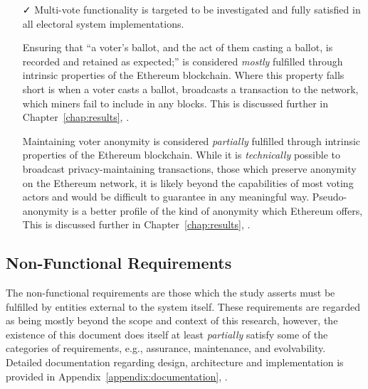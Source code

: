 \begin{itemize}[topsep=0pt]
  \item[\faCheck] Multi-vote functionality is targeted to be investigated and
    fully satisfied in all electoral system implementations.

  \item[\faPlus] Ensuring that ``a voter's ballot, and the act of them casting a
    ballot, is recorded and retained as expected;'' is considered \emph{mostly}
    fulfilled through intrinsic properties of the Ethereum blockchain. Where
    this property falls short is when a voter casts a ballot, broadcasts a
    transaction to the network, which miners fail to include in any blocks. This
    is discussed further in Chapter~\ref{chap:results},
    \emph{}.

  \item[\faMinus] Maintaining voter anonymity is considered \emph{partially}
    fulfilled through intrinsic properties of the Ethereum blockchain. While it
    is \emph{technically} possible to broadcast privacy-maintaining
    transactions, those which preserve anonymity on the Ethereum network, it is
    likely beyond the capabilities of most voting actors and would be difficult
    to guarantee in any meaningful way. Pseudo-anonymity is a better profile of
    the kind of anonymity which Ethereum offers, This is discussed further in
    Chapter~\ref{chap:results}, \emph{}.
\end{itemize}

\subsection{Non-Functional Requirements}
The non-functional requirements are those which the study asserts must be
fulfilled by entities external to the system itself. These requirements are
regarded as being mostly beyond the scope and context of this research, however,
the existence of this document does itself at least \emph{partially} satisfy
some of the categories of requirements, e.g., assurance, maintenance, and
evolvability. Detailed documentation regarding design, architecture and
implementation is provided in Appendix~\ref{appendix:documentation},
\emph{}.
